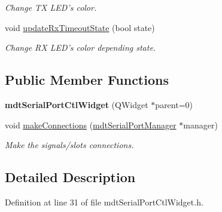 \begin{DoxyCompactItemize}
\begin{DoxyCompactList}\small\item\em Change TX LED's color. \end{DoxyCompactList}\item 
\hypertarget{classmdt_serial_port_ctl_widget_a5cbb9a5ef4098dec46a9330372dc882c}{
void \hyperlink{classmdt_serial_port_ctl_widget_a5cbb9a5ef4098dec46a9330372dc882c}{updateRxTimeoutState} (bool state)}
\label{classmdt_serial_port_ctl_widget_a5cbb9a5ef4098dec46a9330372dc882c}

\begin{DoxyCompactList}\small\item\em Change RX LED's color depending state. \end{DoxyCompactList}\end{DoxyCompactItemize}
\subsection*{Public Member Functions}
\begin{DoxyCompactItemize}
\item 
\hypertarget{classmdt_serial_port_ctl_widget_ae2fac54a22a572b5f3348322a27cced9}{
{\bfseries mdtSerialPortCtlWidget} (QWidget $\ast$parent=0)}
\label{classmdt_serial_port_ctl_widget_ae2fac54a22a572b5f3348322a27cced9}

\item 
void \hyperlink{classmdt_serial_port_ctl_widget_a9dce60a846cbf24d7ceab099ff147c18}{makeConnections} (\hyperlink{classmdt_serial_port_manager}{mdtSerialPortManager} $\ast$manager)
\begin{DoxyCompactList}\small\item\em Make the signals/slots connections. \end{DoxyCompactList}\end{DoxyCompactItemize}


\subsection{Detailed Description}


Definition at line 31 of file mdtSerialPortCtlWidget.h.



